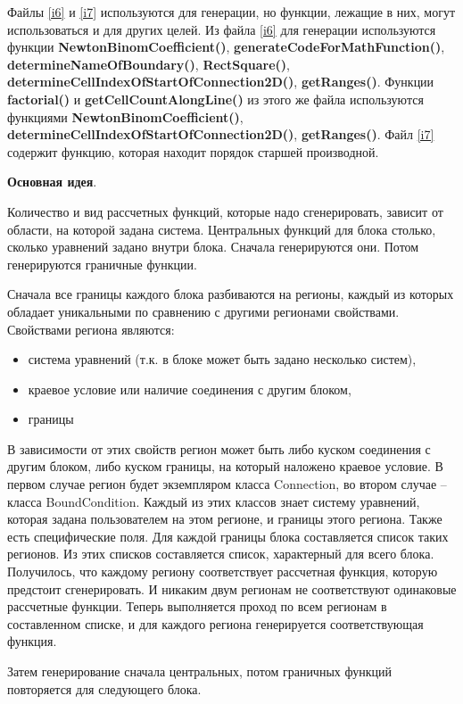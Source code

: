 \documentclass[a4paper]{article}
\begin{document}
Файлы \ref{i6} и \ref{i7} используются для генерации, но функции, лежащие в них, могут использоваться и для других целей. Из файла \ref{i6} для генерации используются функции {\bf NewtonBinomCoefficient()}, {\bf generateCodeForMathFunction()}, {\bf determineNameOfBoundary()}, {\bf RectSquare()}, {\bf determineCellIndexOfStartOfConnection2D()}, {\bf getRanges()}. Функции {\bf factorial()} и {\bf getCellCountAlongLine()} из этого же файла используются функциями {\bf NewtonBinomCoefficient()}, {\bf determineCellIndexOfStartOfConnection2D()}, {\bf getRanges()}. Файл \ref{i7} содержит функцию, которая находит порядок старшей про\-из\-вод\-ной.

\bigskip
{\bf Основная идея}.

Количество и вид рассчетных функций, которые надо сгенерировать, зависит от области, на которой задана система. Центральных функций для блока столько, сколько уравнений задано внутри блока. Сначала генерируются они. Потом ге\-не\-ри\-ру\-ют\-ся граничные функции.

Сначала все границы каждого блока разбиваются на регионы, каждый из которых обладает уникальными по сравнению с другими регионами свойствами. Свойствами региона являются:
\begin{itemize}
\item система уравнений (т.к. в блоке может быть задано несколько систем),
\item краевое условие или наличие соединения с другим блоком,
\item границы
\end{itemize}
В зависимости от этих свойств регион может быть либо куском соединения с другим блоком, либо куском границы, на который наложено краевое условие. В первом случае регион будет экземпляром класса Connection, во втором случае -- класса BoundCondition. Каждый из этих классов знает систему уравнений, которая задана пользователем на этом регионе, и границы этого региона. Также есть специфические поля. Для каждой границы блока составляется список таких регионов. Из этих списков составляется список, характерный для всего блока. Получилось, что каждому региону соответствует рассчетная функция, которую предстоит сгенерировать. И никаким двум регионам не соответствуют одинаковые рассчетные функции. Теперь выполняется проход по всем регионам в составленном списке, и для каждого региона генерируется соответствующая функция.

Затем генерирование сначала центральных, потом граничных функций по\-вто\-ря\-ет\-ся для следующего блока.
\end{document}
